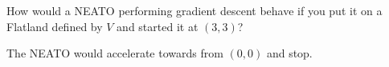 How would a NEATO performing gradient descent behave if you put it on a Flatland defined by $V$ and started it at $(3, 3)$?

\begin{solution}
    The NEATO would accelerate towards from $(0, 0)$ and stop.
\end{solution}